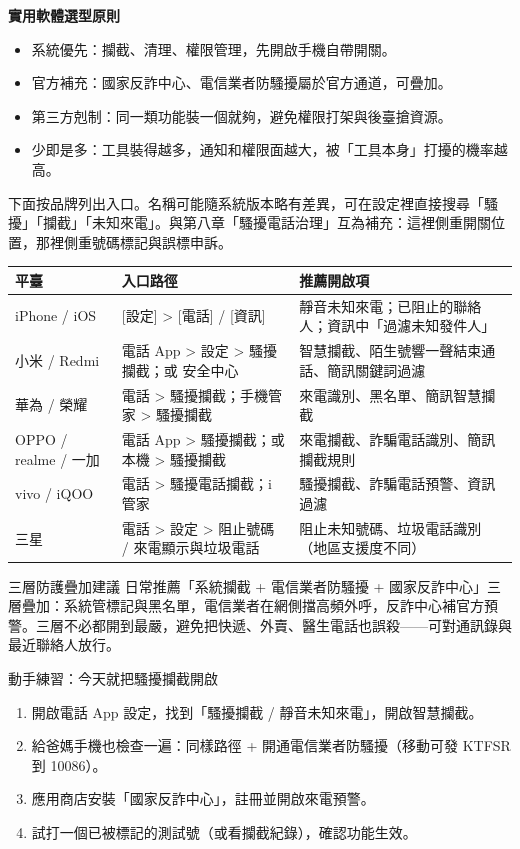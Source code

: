 \textbf{實用軟體選型原則}\par

\begin{itemize}
  \item 系統優先：攔截、清理、權限管理，先開啟手機自帶開關。
  \item 官方補充：國家反詐中心、電信業者防騷擾屬於官方通道，可疊加。
  \item 第三方剋制：同一類功能裝一個就夠，避免權限打架與後臺搶資源。
  \item 少即是多：工具裝得越多，通知和權限面越大，被「工具本身」打擾的機率越高。
\end{itemize}


下面按品牌列出入口。名稱可能隨系統版本略有差異，可在設定裡直接搜尋「騷擾」「攔截」「未知來電」。與第八章「騷擾電話治理」互為補充：這裡側重開關位置，那裡側重號碼標記與誤標申訴。

\begin{center}
\begin{tabularx}{\linewidth}{|X|X|X|}
\hline
\textbf{平臺} & \textbf{入口路徑} & \textbf{推薦開啟項} \tabularnewline
\hline
iPhone / iOS & {}[設定] > [電話] / [資訊] & 靜音未知來電；已阻止的聯絡人；資訊中「過濾未知發件人」 \tabularnewline
小米 / Redmi & 電話 App > 設定 > 騷擾攔截；或 安全中心 & 智慧攔截、陌生號響一聲結束通話、簡訊關鍵詞過濾 \tabularnewline
華為 / 榮耀 & 電話 > 騷擾攔截；手機管家 > 騷擾攔截 & 來電識別、黑名單、簡訊智慧攔截 \tabularnewline
OPPO / realme / 一加 & 電話 App > 騷擾攔截；或 本機 > 騷擾攔截 & 來電攔截、詐騙電話識別、簡訊攔截規則 \tabularnewline
vivo / iQOO & 電話 > 騷擾電話攔截；i 管家 & 騷擾攔截、詐騙電話預警、資訊過濾 \tabularnewline
三星 & 電話 > 設定 > 阻止號碼 / 來電顯示與垃圾電話 & 阻止未知號碼、垃圾電話識別（地區支援度不同） \tabularnewline
\hline
\end{tabularx}
\end{center}

\begin{tcbinfo}{三層防護疊加建議}
日常推薦「系統攔截 + 電信業者防騷擾 + 國家反詐中心」三層疊加：系統管標記與黑名單，電信業者在網側擋高頻外呼，反詐中心補官方預警。三層不必都開到最嚴，避免把快遞、外賣、醫生電話也誤殺——可對通訊錄與最近聯絡人放行。

\end{tcbinfo}

\begin{tcbpractice}{動手練習：今天就把騷擾攔截開啟}
\begin{enumerate}
  \item 開啟電話 App 設定，找到「騷擾攔截 / 靜音未知來電」，開啟智慧攔截。
  \item 給爸媽手機也檢查一遍：同樣路徑 + 開通電信業者防騷擾（移動可發 KTFSR 到 10086）。
  \item 應用商店安裝「國家反詐中心」，註冊並開啟來電預警。
  \item 試打一個已被標記的測試號（或看攔截紀錄），確認功能生效。
\end{enumerate}

\end{tcbpractice}

